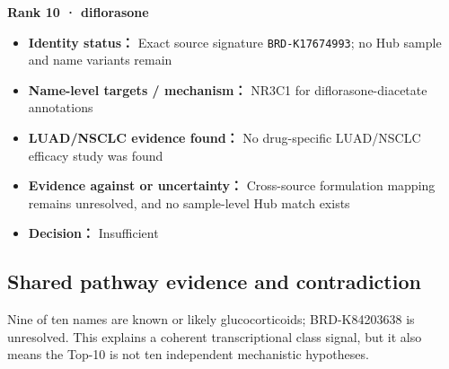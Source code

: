 \documentclass[
  10pt,
]{ctexart}
\providecommand{\tightlist}{%
  \setlength{\itemsep}{0pt}\setlength{\parskip}{0pt}}
\begin{document}
\textbf{Rank 10 · diflorasone}

\begin{itemize}
\tightlist
\item
  \textbf{Identity status：} Exact source signature
  \texttt{BRD-K17674993}; no Hub sample and name variants remain
\item
  \textbf{Name-level targets / mechanism：} NR3C1 for
  diflorasone-diacetate annotations
\item
  \textbf{LUAD/NSCLC evidence found：} No drug-specific LUAD/NSCLC
  efficacy study was found
\item
  \textbf{Evidence against or uncertainty：} Cross-source formulation
  mapping remains unresolved, and no sample-level Hub match exists
\item
  \textbf{Decision：} Insufficient
\end{itemize}

\subsection{Shared pathway evidence and
contradiction}\label{shared-pathway-evidence-and-contradiction}

Nine of ten names are known or likely glucocorticoids; BRD-K84203638 is
unresolved. This explains a coherent transcriptional class signal, but
it also means the Top-10 is not ten independent mechanistic hypotheses.
\end{document}
